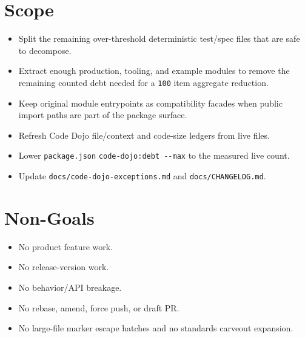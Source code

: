 \section{Scope}\label{record-244-scope}

\begin{itemize}
\tightlist
\item
  Split the remaining over-threshold deterministic test/spec files that are safe to decompose.
\item
  Extract enough production, tooling, and example modules to remove the remaining counted debt needed for a \texttt{1\allowbreak{}0\allowbreak{}0} item aggregate reduction.
\item
  Keep original module entrypoints as compatibility facades when public import paths are part of the package surface.
\item
  Refresh Code Dojo file/context and code-size ledgers from live files.
\item
  Lower \texttt{p\allowbreak{}a\allowbreak{}c\allowbreak{}k\allowbreak{}a\allowbreak{}g\allowbreak{}e\allowbreak{}.\allowbreak{}j\allowbreak{}s\allowbreak{}o\allowbreak{}n} \texttt{c\allowbreak{}o\allowbreak{}d\allowbreak{}e\allowbreak{}-\allowbreak{}d\allowbreak{}o\allowbreak{}j\allowbreak{}o\allowbreak{}:\allowbreak{}d\allowbreak{}e\allowbreak{}b\allowbreak{}t\allowbreak{} \allowbreak{}-\allowbreak{}-\allowbreak{}m\allowbreak{}a\allowbreak{}x} to the measured live count.
\item
  Update \texttt{d\allowbreak{}o\allowbreak{}c\allowbreak{}s\allowbreak{}/\allowbreak{}c\allowbreak{}o\allowbreak{}d\allowbreak{}e\allowbreak{}-\allowbreak{}d\allowbreak{}o\allowbreak{}j\allowbreak{}o\allowbreak{}-\allowbreak{}e\allowbreak{}x\allowbreak{}c\allowbreak{}e\allowbreak{}p\allowbreak{}t\allowbreak{}i\allowbreak{}o\allowbreak{}n\allowbreak{}s\allowbreak{}.\allowbreak{}m\allowbreak{}d} and \texttt{d\allowbreak{}o\allowbreak{}c\allowbreak{}s\allowbreak{}/\allowbreak{}C\allowbreak{}H\allowbreak{}A\allowbreak{}N\allowbreak{}G\allowbreak{}E\allowbreak{}L\allowbreak{}O\allowbreak{}G\allowbreak{}.\allowbreak{}m\allowbreak{}d}.
\end{itemize}

\section{Non-Goals}\label{record-244-non-goals}

\begin{itemize}
\tightlist
\item
  No product feature work.
\item
  No release-version work.
\item
  No behavior/API breakage.
\item
  No rebase, amend, force push, or draft PR.
\item
  No large-file marker escape hatches and no standards carveout expansion.
\end{itemize}

